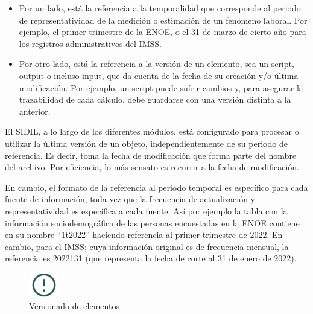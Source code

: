 \documentclass[
]{article}
\begin{document}
\begin{itemize}
\item
  Por un lado, está la referencia a la temporalidad que corresponde al periodo de representatividad de la medición o estimación de un fenómeno laboral. Por ejemplo, el primer trimestre de la ENOE, o el 31 de marzo de cierto año para los registros administrativos del IMSS.
\item
  Por otro lado, está la referencia a la versión de un elemento, sea un script, output o incluso input, que da cuenta de la fecha de su creación y/o última modificación. Por ejemplo, un script puede sufrir cambios y, para asegurar la trazabilidad de cada cálculo, debe guardarse con una versión distinta a la anterior.
\end{itemize}

El SIDIL, a lo largo de los diferentes módulos, está configurado para procesar o utilizar la última versión de un objeto, independientemente de su periodo de referencia. Es decir, toma la fecha de modificación que forma parte del nombre del archivo. Por eficiencia, lo más sensato es recurrir a la fecha de modificación.

En cambio, el formato de la referencia al periodo temporal es específico para cada fuente de información, toda vez que la frecuencia de actualización y representatividad es específica a cada fuente. Así por ejemplo la tabla con la información sociodemográfica de las personas encuestadas en la ENOE contiene en su nombre ``1t2022'' haciendo referencia al primer trimestre de 2022. En cambio, para el IMSS; cuya información original es de frecuencia mensual, la referencia es 2022131 (que representa la fecha de corte al 31 de enero de 2022).

\begin{figure}
\includegraphics[width=50px,style="float:left; background-color: #f5f5f5; padding-right:1em"]{images-1/important-icon} \caption{Versionado de elementos}\label{fig:versionadoelementos}
\end{figure}
\end{document}
